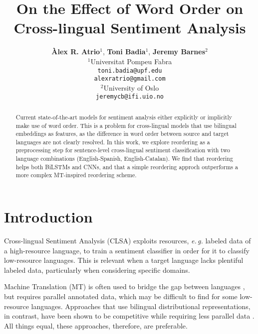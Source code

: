\documentclass[11pt,a4paper]{article}
\title{On the Effect of Word Order on Cross-lingual Sentiment Analysis}
\author {\textbf{Àlex R. Atrio$^1$}, \textbf{Toni Badia$^{1}$}, \textbf{Jeremy Barnes$^{2}$}\\[5pt]
$^1$Universitat Pompeu Fabra\\
{\tt toni.badia@upf.edu} \\[1pt]
{\tt alexratrio@gmail.com} \\[5pt]
$^2$University of Oslo\\
{\tt jeremycb@ifi.uio.no}
}
\date{}
\newcommand{\eg}{\textit{e.\,g.}\xspace}
\begin{document}
\maketitle
\begin{abstract}
Current state-of-the-art models for sentiment analysis
either explicitly or implicitly make use of word order.
This is a problem for cross-lingual models that
use bilingual embeddings as features, as the difference
in word order between source and target languages are
not clearly resolved. In this work, we explore reordering
as a preprocessing step for sentence-level cross-lingual sentiment
classification with two language combinations
(English-Spanish, English-Catalan). We find that reordering helps both BiLSTMs and CNNs, and that a simple reordering
approch outperforms a more complex MT-inspired reordering
scheme.


\end{abstract}


\section{Introduction}




Cross-lingual Sentiment Analysis (CLSA) exploits resources, \eg labeled data of a high-resource language, to train a sentiment classifier in order for it to classify low-resource languages. This is relevant when a target language lacks plentiful labeled data, particularly when considering specific domains. 

Machine Translation (MT) is often used to bridge the gap between languages \cite{Banea2008,Balahur2014d}, but requires parallel annotated data, which may be difficult to find for some low-resource languages. Approaches that use bilingual distributional representations, in contrast, have been shown to be competitive while requiring less parallel data \cite{Chen2016,Barnes2018b}. All things equal, these approaches, therefore, are preferable.
\end{document}
